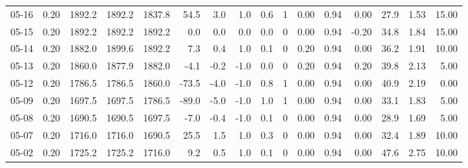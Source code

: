 \begin{threeparttable}
{\begin{tabular}{lrrrrrrrrrrrrrrr}
  05-16 &     0.20 & 1892.2 & 1892.2 & 1837.8 &       54.5 &            3.0 &                      1.0 &                 0.6 &              1 &       0.00 &      0.94 &           0.00 &             27.9 &            1.53 &                  15.00 \\
  05-15 &     0.20 & 1892.2 & 1892.2 & 1892.2 &        0.0 &            0.0 &                      0.0 &                 0.0 &              0 &       0.00 &      0.94 &          -0.20 &             34.8 &            1.84 &                  15.00 \\
  05-14 &     0.20 & 1882.0 & 1899.6 & 1892.2 &        7.3 &            0.4 &                      1.0 &                 0.1 &              0 &       0.20 &      0.94 &           0.00 &             36.2 &            1.91 &                  10.00 \\
  05-13 &     0.20 & 1860.0 & 1877.9 & 1882.0 &       -4.1 &           -0.2 &                     -1.0 &                 0.0 &              0 &       0.20 &      0.94 &           0.20 &             39.8 &            2.13 &                   5.00 \\
  05-12 &     0.20 & 1786.5 & 1786.5 & 1860.0 &      -73.5 &           -4.0 &                     -1.0 &                 0.8 &              1 &       0.00 &      0.94 &           0.00 &             40.9 &            2.19 &                   0.00 \\
  05-09 &     0.20 & 1697.5 & 1697.5 & 1786.5 &      -89.0 &           -5.0 &                     -1.0 &                 1.0 &              1 &       0.00 &      0.94 &           0.00 &             33.1 &            1.83 &                   5.00 \\
  05-08 &     0.20 & 1690.5 & 1690.5 & 1697.5 &       -7.0 &           -0.4 &                     -1.0 &                 0.1 &              0 &       0.00 &      0.94 &           0.00 &             28.9 &            1.69 &                   5.00 \\
  05-07 &     0.20 & 1716.0 & 1716.0 & 1690.5 &       25.5 &            1.5 &                      1.0 &                 0.3 &              0 &       0.00 &      0.94 &           0.00 &             32.4 &            1.89 &                  10.00 \\
  05-02 &     0.20 & 1725.2 & 1725.2 & 1716.0 &        9.2 &            0.5 &                      1.0 &                 0.1 &              0 &       0.00 &      0.94 &           0.00 &             47.6 &            2.75 &                  10.00 \\

\end{tabular}}
\end{threeparttable}
